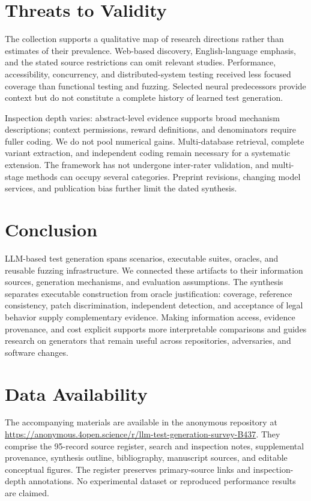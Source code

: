 \section{Threats to Validity}
The collection supports a qualitative map of research directions rather than estimates of their prevalence. Web-based discovery, English-language emphasis, and the stated source restrictions can omit relevant studies. Performance, accessibility, concurrency, and distributed-system testing received less focused coverage than functional testing and fuzzing. Selected neural predecessors provide context but do not constitute a complete history of learned test generation.

Inspection depth varies: abstract-level evidence supports broad mechanism descriptions; context permissions, reward definitions, and denominators require fuller coding. We do not pool numerical gains. Multi-database retrieval, complete variant extraction, and independent coding remain necessary for a systematic extension. The framework has not undergone inter-rater validation, and multi-stage methods can occupy several categories. Preprint revisions, changing model services, and publication bias further limit the dated synthesis.

\section{Conclusion}
LLM-based test generation spans scenarios, executable suites, oracles, and reusable fuzzing infrastructure. We connected these artifacts to their information sources, generation mechanisms, and evaluation assumptions. The synthesis separates executable construction from oracle justification: coverage, reference consistency, patch discrimination, independent detection, and acceptance of legal behavior supply complementary evidence. Making information access, evidence provenance, and cost explicit supports more interpretable comparisons and guides research on generators that remain useful across repositories, adversaries, and software changes.

\section*{Data Availability}
The accompanying materials are available in the anonymous repository at \url{https://anonymous.4open.science/r/llm-test-generation-survey-B437}. They comprise the 95-record source register, search and inspection notes, supplemental provenance, synthesis outline, bibliography, manuscript sources, and editable conceptual figures. The register preserves primary-source links and inspection-depth annotations. No experimental dataset or reproduced performance results are claimed.

